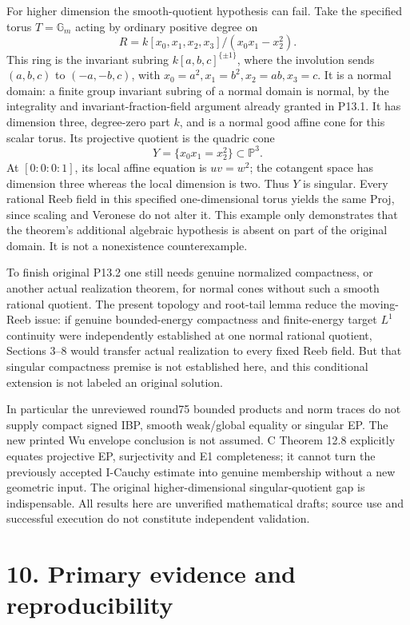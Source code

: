 \documentclass[
  10pt,
]{article}
\begin{document}
For higher dimension the smooth-quotient hypothesis can fail. Take the
specified torus \(T=\mathbb G_m\) acting by ordinary positive degree on
\[
R=k[x_0,x_1,x_2,x_3]/(x_0x_1-x_2^2).
\] This ring is the invariant subring \(k[a,b,c]^{\{\pm1\}}\), where the
involution sends \((a,b,c)\) to \((-a,-b,c)\), with
\(x_0=a^2,x_1=b^2,x_2=ab,x_3=c\). It is a normal domain: a finite group
invariant subring of a normal domain is normal, by the integrality and
invariant-fraction-field argument already granted in P13.1. It has
dimension three, degree-zero part \(k\), and is a normal good affine
cone for this scalar torus. Its projective quotient is the quadric cone
\[
Y=\{x_0x_1=x_2^2\}\subset\mathbb P^3.
\] At \([0:0:0:1]\), its local affine equation is \(uv=w^2\); the
cotangent space has dimension three whereas the local dimension is two.
Thus \(Y\) is singular. Every rational Reeb field in this specified
one-dimensional torus yields the same Proj, since scaling and Veronese
do not alter it. This example only demonstrates that the theorem's
additional algebraic hypothesis is absent on part of the original
domain. It is not a nonexistence counterexample.

To finish original P13.2 one still needs genuine normalized compactness,
or another actual realization theorem, for normal cones without such a
smooth rational quotient. The present topology and root-tail lemma
reduce the moving-Reeb issue: if genuine bounded-energy compactness and
finite-energy target \(L^1\) continuity were independently established
at one normal rational quotient, Sections 3--8 would transfer actual
realization to every fixed Reeb field. But that singular compactness
premise is not established here, and this conditional extension is not
labeled an original solution.

In particular the unreviewed round75 bounded products and norm traces do
not supply compact signed IBP, smooth weak/global equality or singular
EP. The new printed Wu envelope conclusion is not assumed. C Theorem
12.8 explicitly equates projective EP, surjectivity and E1 completeness;
it cannot turn the previously accepted I-Cauchy estimate into genuine
membership without a new geometric input. The original
higher-dimensional singular-quotient gap is indispensable. All results
here are unverified mathematical drafts; source use and successful
execution do not constitute independent validation.

\section{10. Primary evidence and
reproducibility}\label{primary-evidence-and-reproducibility}
\end{document}

